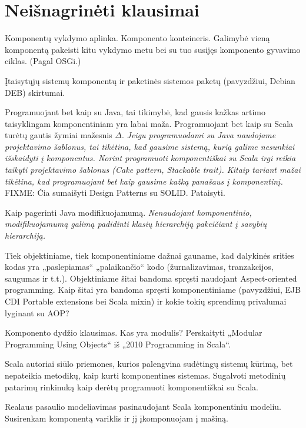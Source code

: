 \chapter{Neišnagrinėti klausimai}

Komponentų vykdymo aplinka. Komponento konteineris. Galimybė vieną
komponentą pakeisti kitu vykdymo metu bei su tuo susijęs komponento
gyvavimo ciklas. (Pagal OSGi.)

Įtaisytųjų  sistemų komponentų ir paketinės sistemos
paketų (pavyzdžiui, Debian DEB) skirtumai.

Programuojant bet kaip su Java, tai tikimybė, kad gausis kažkas artimo
taisyklingam komponentiniam yra labai maža. Programuojant bet kaip su
Scala turėtų gautis žymiai mažesnis $\Delta$. \emph{Jeigu programuodami
su Java naudojame projektavimo šablonus, tai tikėtina, kad gausime
sistemą, kurią galime nesunkiai išskaidyti į komponentus. Norint
programuoti komponentiškai su Scala irgi reikia taikyti projektavimo
šablonus (Cake pattern, Stackable trait). Kitaip tariant mažai tikėtina,
kad programuojant bet kaip gausime kažką panašaus į komponentinį.}
FIXME: Čia sumaišyti Design Patterns su SOLID. Pataisyti.

Kaip pagerinti Java modifikuojamumą. \emph{Nenaudojant komponentinio,
modifikuojamumą galimą padidinti klasių hierarchiją pakeičiant
į savybių hierarchiją.}

Tiek objektiniame, tiek komponentiniame dažnai gauname, kad dalykinės
srities kodas yra „paslepiamas“ „palaikančio“ kodo (žurnalizavimas,
tranzakcijos, saugumas ir t.t.). Objektiniame šitai bandoma spręsti
naudojant Aspect-oriented programming. Kaip šitai yra bandoma
spręsti komponentiniame (pavyzdžiui, EJB CDI Portable extensions
bei Scala mixin) ir kokie tokių sprendimų privalumai lyginant su AOP?

Komponento dydžio klausimas. Kas yra modulis? Perskaityti „Modular
Programming Using Objects“ iš „2010 Programming in Scala“.

Scala autoriai siūlo priemones, kurios palengvina sudėtingų sistemų
kūrimą, bet nepateikia metodikų, kaip kurti komponentines sistemas.
Sugalvoti metodinių patarimų rinkinuką kaip derėtų programuoti
komponentiškai su Scala.

Realaus pasaulio modeliavimas pasinaudojant Scala komponentiniu
modeliu. Susirenkam komponentą variklis ir jį įkomponuojam į
mašiną.

